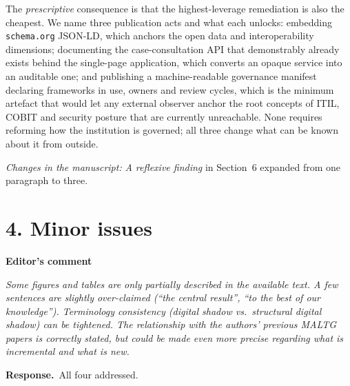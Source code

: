\documentclass[11pt,a4paper]{article}
\newenvironment{comment}[1]
  {\par\vspace{6pt}\noindent\textbf{#1}\par\vspace{2pt}%
   \begin{mdframed}[backgroundcolor=cmtbg, linecolor=cmtrule, linewidth=0.6pt,
     innertopmargin=5pt, innerbottommargin=5pt, innerleftmargin=7pt,
     innerrightmargin=7pt, skipabove=2pt, skipbelow=5pt]\itshape}
  {\end{mdframed}}
\newcommand{\respuesta}{\par\noindent\textbf{Response.}\ }
\newcommand{\changed}[1]{\par\vspace{3pt}\noindent\textit{Changes in the manuscript:} #1\par}
\begin{document}
The \emph{prescriptive} consequence is that the highest-leverage remediation is also the cheapest. We name three publication acts and what each unlocks: embedding \texttt{schema.org} JSON-LD, which anchors the open data and interoperability dimensions; documenting the case-consultation API that demonstrably already exists behind the single-page application, which converts an opaque service into an auditable one; and publishing a machine-readable governance manifest declaring frameworks in use, owners and review cycles, which is the minimum artefact that would let any external observer anchor the root concepts of ITIL, COBIT and security posture that are currently unreachable. None requires reforming how the institution is governed; all three change what can be known about it from outside.

\changed{\emph{A reflexive finding} in Section~6 expanded from one paragraph to three.}

\section*{4. Minor issues}

\begin{comment}{Editor's comment}
Some figures and tables are only partially described in the available text. A few sentences are slightly over-claimed (``the central result'', ``to the best of our knowledge''). Terminology consistency (digital shadow vs.\ structural digital shadow) can be tightened. The relationship with the authors' previous MALTG papers is correctly stated, but could be made even more precise regarding what is incremental and what is new.
\end{comment}

\respuesta All four addressed.
\end{document}
